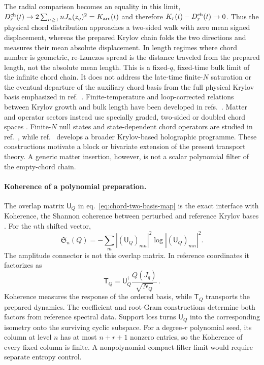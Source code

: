 \documentclass[a4paper,11pt]{article}
\def\Jac{J}%
\theoremstyle{definition}
\theoremstyle{remark}
\newcommand{\Jac}{\mathsf J}
\begin{document}
The radial comparison becomes an equality in this limit, 
$D_r^{\rm ch}(t)\to2\sum_{n\ge1}nJ_n(z_q)^2=K_{\rm arc}(t)$ and therefore
$K_r(t)-D_r^{\rm ch}(t)\to0$.
Thus the physical chord distribution approaches a two-sided walk with zero mean signed
displacement, whereas the prepared Krylov chain folds the two directions and measures their mean
absolute displacement.  In length regimes where chord number is geometric, re-Lanczos spread is
the distance traveled from the prepared length, not the absolute mean length.  This is a
fixed-$q$, fixed-time bulk limit of the infinite chord chain.  It does not address the late-time
finite-$N$ saturation or the eventual departure of the auxiliary chord basis from the full
physical Krylov basis emphasized in ref.~\cite{BalasubramanianMaganNandiWu2026}.  Finite-temperature
and loop-corrected relations between Krylov growth and bulk length have been developed in
refs.~\cite{HellerPapaliniSchuhmann2025,AlfinitoBeccaria2026HigherLoop,AlfinitoBeccaria2026Onset}.
Matter and operator sectors instead use specially graded, two-sided or doubled chord spaces
\cite{Okuyama2024Doubled,AmbrosiniEtAl2025,AguilarGutierrez2025}.  Finite-$N$ null states and
state-dependent chord operators are studied in ref.~\cite{MiyajiMoriOkuyama2025}, while
ref.~\cite{FuEtAl2026} develops a broader Krylov-based holographic programme.  These constructions
motivate a block or bivariate extension of the present transport theory.  A generic matter
insertion, however, is not a scalar polynomial filter of the empty-chord chain.

\paragraph{Koherence of a polynomial preparation.}
The overlap matrix $\mathsf U_Q$ in eq.~\eqref{eq:chord-two-basis-map} is the exact interface with
Koherence, the Shannon coherence between perturbed and reference Krylov bases
\cite{Balasubramanian:2025variations}.  For the $n$th shifted vector,
\begin{equation}
   \mathfrak S_n(Q)
   =-\sum_m |(\mathsf U_Q)_{mn}|^2
       \log |(\mathsf U_Q)_{mn}|^2.
   \label{eq:polynomial-koherence}
\end{equation}
The amplitude connector is not this overlap matrix.  In reference coordinates it factorizes as
\begin{equation}
   \mathsf T_Q
   =\mathsf U_Q^\dagger\frac{Q(\Jac_q)}{\sqrt{N_Q}}\,.
   \label{eq:connector-koherence-factorization}
\end{equation}
Koherence measures the response of the ordered basis, while $\mathsf T_Q$ transports the prepared
dynamics.  The coefficient and root-Gram constructions determine both factors from reference
spectral data.  Support loss turns $\mathsf U_Q$ into the corresponding isometry onto the
surviving cyclic subspace.  For a degree-$r$ polynomial seed, its column at level $n$ has at most
$n+r+1$ nonzero entries, so the Koherence of every fixed column is finite.  A nonpolynomial
compact-filter limit would require separate entropy control.
\end{document}
